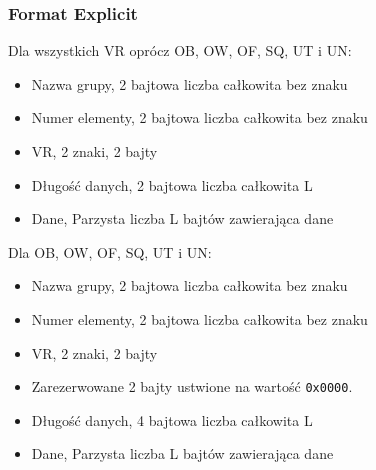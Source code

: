 \documentclass{beamer}
\begin{document}
\begin{frame}[allowframebreaks]
  \frametitle{Format Explicit}

Dla wszystkich VR oprócz OB, OW, OF, SQ, UT i UN:
\begin{itemize}
  \item Nazwa grupy, 2 bajtowa liczba całkowita bez znaku
  \item Numer elementy, 2 bajtowa liczba całkowita bez znaku
  \item VR, 2 znaki, 2 bajty
  \item Długość danych, 2 bajtowa liczba całkowita L
  \item Dane, Parzysta liczba L bajtów zawierająca dane  
\end{itemize}

\framebreak

Dla OB, OW, OF, SQ, UT i UN:
\begin{itemize}
  \item Nazwa grupy, 2 bajtowa liczba całkowita bez znaku
  \item Numer elementy, 2 bajtowa liczba całkowita bez znaku
  \item VR, 2 znaki, 2 bajty
  \item Zarezerwowane 2 bajty ustwione na wartość \texttt{0x0000}.
  \item Długość danych, 4 bajtowa liczba całkowita L
  \item Dane, Parzysta liczba L bajtów zawierająca dane  
\end{itemize}
\end{frame}




\end{document}
